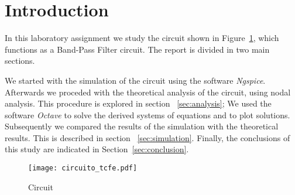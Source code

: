 \section{Introduction}
\label{sec:introduction}

In this laboratory assignment we study the circuit
shown in Figure~\ref{fig:circuit}, which functions as a Band-Pass Filter
circuit. The report is divided in two main sections.

We started with the simulation of the circuit using the software
\textit{Ngspice}.
Afterwards we proceded with the theoretical analysis of the circuit,
using nodal analysis.
This procedure is explored in section ~\ref{sec:analysis};
We used the software \textit{Octave} to solve the derived systems
of equations and to plot solutions.
Subsequently we compared the results of the simulation with the
theoretical results. This is described in section ~\ref{sec:simulation}.
Finally, the conclusions of this study are indicated in
Section~\ref{sec:conclusion}.

\begin{figure}[ht] \centering
    \texttt{[image: circuito\_tcfe.pdf]}
    \caption{Circuit}
    \label{fig:circuit}
\end{figure}

